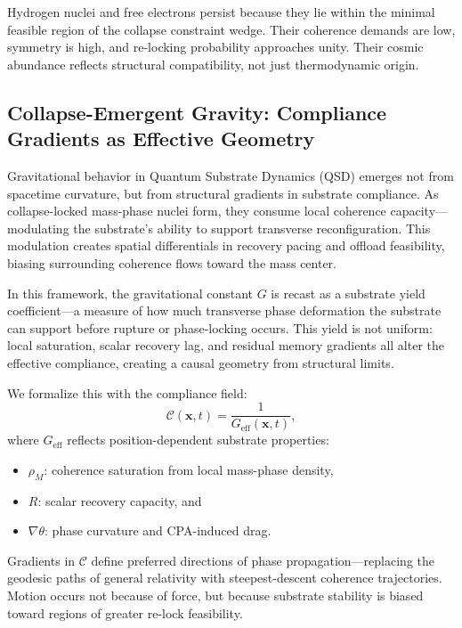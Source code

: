 \documentclass[preprints,article,submit,pdftex,moreauthors]{Definitions/mdpi}
\begin{document}
\begin{tcolorbox}[colback=black!4, colframe=black!30!black, title=Structural Basis for Elemental Abundance]
Hydrogen nuclei and free electrons persist because they lie within the minimal feasible region of the collapse constraint wedge. Their coherence demands are low, symmetry is high, and re-locking probability approaches unity. Their cosmic abundance reflects structural compatibility, not just thermodynamic origin.
\end{tcolorbox}


\subsection{Collapse-Emergent Gravity: Compliance Gradients as Effective Geometry}

Gravitational behavior in Quantum Substrate Dynamics (QSD) emerges not from spacetime curvature, but from structural gradients in substrate compliance. As collapse-locked mass-phase nuclei form, they consume local coherence capacity—modulating the substrate’s ability to support transverse reconfiguration. This modulation creates spatial differentials in recovery pacing and offload feasibility, biasing surrounding coherence flows toward the mass center.

In this framework, the gravitational constant \( G \) is recast as a substrate yield coefficient—a measure of how much transverse phase deformation the substrate can support before rupture or phase-locking occurs. This yield is not uniform: local saturation, scalar recovery lag, and residual memory gradients all alter the effective compliance, creating a causal geometry from structural limits.

We formalize this with the compliance field:
\[
\mathcal{C}(\mathbf{x},t) = \frac{1}{G_{\mathrm{eff}}(\mathbf{x},t)},
\]
where \( G_{\mathrm{eff}} \) reflects position-dependent substrate properties:
\begin{itemize}
    \item \( \rho_M \): coherence saturation from local mass-phase density,
    \item \( R \): scalar recovery capacity, and
    \item \( \nabla \theta \): phase curvature and CPA-induced drag.
\end{itemize}

Gradients in \( \mathcal{C} \) define preferred directions of phase propagation—replacing the geodesic paths of general relativity with steepest-descent coherence trajectories. Motion occurs not because of force, but because substrate stability is biased toward regions of greater re-lock feasibility.
\end{document}
